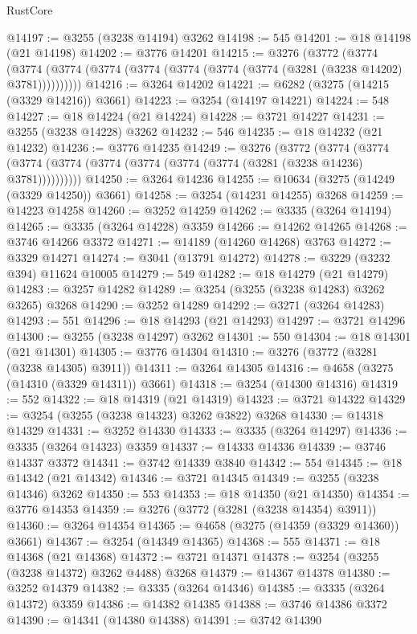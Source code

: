 \begin{lexlean}{RustCore}
\begin{coremodule}
@14197 := @3255 (@3238 @14194) @3262
@14198 := 545
@14201 := @18 @14198 (@21 @14198)
@14202 := @3776 @14201
@14215 := @3276
    (@3772
      (@3774 (@3774 (@3774 (@3774 (@3774 (@3774 (@3774 (@3774 (@3281 (@3238 @14202) @3781))))))))))
@14216 := @3264 @14202
@14221 := @6282 (@3275 (@14215 (@3329 @14216)) @3661)
@14223 := @3254 (@14197 @14221)
@14224 := 548
@14227 := @18 @14224 (@21 @14224)
@14228 := @3721 @14227
@14231 := @3255 (@3238 @14228) @3262
@14232 := 546
@14235 := @18 @14232 (@21 @14232)
@14236 := @3776 @14235
@14249 := @3276
    (@3772
      (@3774 (@3774 (@3774 (@3774 (@3774 (@3774 (@3774 (@3774 (@3281 (@3238 @14236) @3781))))))))))
@14250 := @3264 @14236
@14255 := @10634 (@3275 (@14249 (@3329 @14250)) @3661)
@14258 := @3254 (@14231 @14255) @3268
@14259 := @14223 @14258
@14260 := @3252 @14259
@14262 := @3335 (@3264 @14194)
@14265 := @3335 (@3264 @14228) @3359
@14266 := @14262 @14265
@14268 := @3746 @14266 @3372
@14271 := @14189 (@14260 @14268) @3763
@14272 := @3329 @14271
@14274 := @3041 (@13791 @14272)
@14278 := @3229 (@3232 @394) @11624 @10005
@14279 := 549
@14282 := @18 @14279 (@21 @14279)
@14283 := @3257 @14282
@14289 := @3254 (@3255 (@3238 @14283) @3262 @3265) @3268
@14290 := @3252 @14289
@14292 := @3271 (@3264 @14283)
@14293 := 551
@14296 := @18 @14293 (@21 @14293)
@14297 := @3721 @14296
@14300 := @3255 (@3238 @14297) @3262
@14301 := 550
@14304 := @18 @14301 (@21 @14301)
@14305 := @3776 @14304
@14310 := @3276 (@3772 (@3281 (@3238 @14305) @3911))
@14311 := @3264 @14305
@14316 := @4658 (@3275 (@14310 (@3329 @14311)) @3661)
@14318 := @3254 (@14300 @14316)
@14319 := 552
@14322 := @18 @14319 (@21 @14319)
@14323 := @3721 @14322
@14329 := @3254 (@3255 (@3238 @14323) @3262 @3822) @3268
@14330 := @14318 @14329
@14331 := @3252 @14330
@14333 := @3335 (@3264 @14297)
@14336 := @3335 (@3264 @14323) @3359
@14337 := @14333 @14336
@14339 := @3746 @14337 @3372
@14341 := @3742 @14339 @3840
@14342 := 554
@14345 := @18 @14342 (@21 @14342)
@14346 := @3721 @14345
@14349 := @3255 (@3238 @14346) @3262
@14350 := 553
@14353 := @18 @14350 (@21 @14350)
@14354 := @3776 @14353
@14359 := @3276 (@3772 (@3281 (@3238 @14354) @3911))
@14360 := @3264 @14354
@14365 := @4658 (@3275 (@14359 (@3329 @14360)) @3661)
@14367 := @3254 (@14349 @14365)
@14368 := 555
@14371 := @18 @14368 (@21 @14368)
@14372 := @3721 @14371
@14378 := @3254 (@3255 (@3238 @14372) @3262 @4488) @3268
@14379 := @14367 @14378
@14380 := @3252 @14379
@14382 := @3335 (@3264 @14346)
@14385 := @3335 (@3264 @14372) @3359
@14386 := @14382 @14385
@14388 := @3746 @14386 @3372
@14390 := @14341 (@14380 @14388)
@14391 := @3742 @14390

\end{coremodule}
\end{lexlean}
